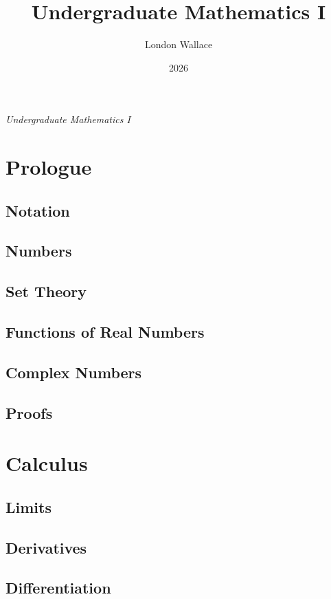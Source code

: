 \documentclass{tufte-book}
\title{Undergraduate Mathematics I}
\author{London Wallace}
\date{2026}
\begin{document}
\begin{titlepage}
	\raggedright {\Large {}}
	\par
	\vspace{8pc}
	{\itshape \Huge {Undergraduate Mathematics I}}
	{\tiny {}}
	\vfill
	{\small {}}
\end{titlepage}

\tableofcontents

\part{Prologue}
\chapter{Notation}
\chapter{Numbers}
\chapter{Set Theory}
\chapter{Functions of Real Numbers}
\chapter{Complex Numbers}
\chapter{Proofs}
\part{Calculus}
\chapter{Limits}
\chapter{Derivatives}
\chapter{Differentiation}
\end{document}
